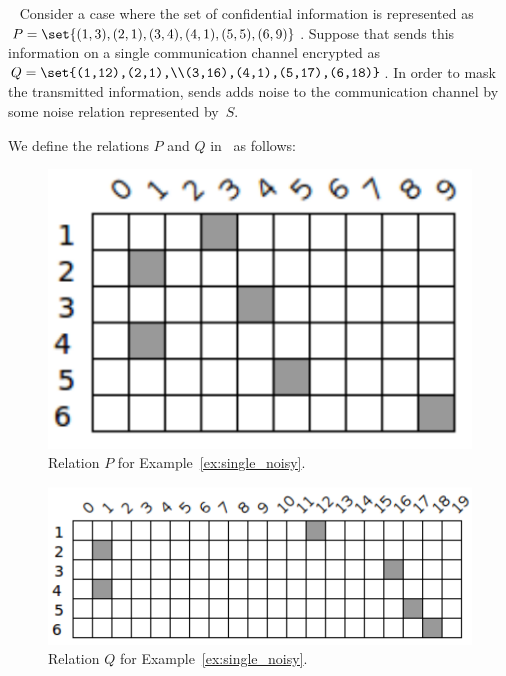 \begin{example}~
\label{ex:single_noisy}
 	Consider a case where the set of confidential information is represented as $P = \set{(1,3),(2,1),(3,4),(4,1),(5,5),(6,9)}$. Suppose that \AgentOne sends this information on a single communication channel encrypted as $Q = \set{(1,12),(2,1),\\(3,16),(4,1),(5,17),(6,18)}$. In order to mask the transmitted information, \AgentOne sends adds noise to the communication channel by some noise relation represented by~$S$. \newline 

	We define the relations $P$ and $Q$ in \relview\ as follows: \newline

	\begin{figure}[ht]
		\centering
		\includegraphics[scale=0.65]{Figures/PDF/Relview/P.pdf}
		\caption{Relation $P$ for Example~\ref{ex:single_noisy}.}
		\label{fig:single_noisy_p}
	\end{figure}
	\begin{figure}[ht]
		\centering
		\includegraphics[scale=0.65]{Figures/PDF/Relview/Q.pdf}
		\caption{Relation $Q$ for Example~\ref{ex:single_noisy}.}
		\label{fig:single_noisy_q}
	\end{figure}


\end{example}

